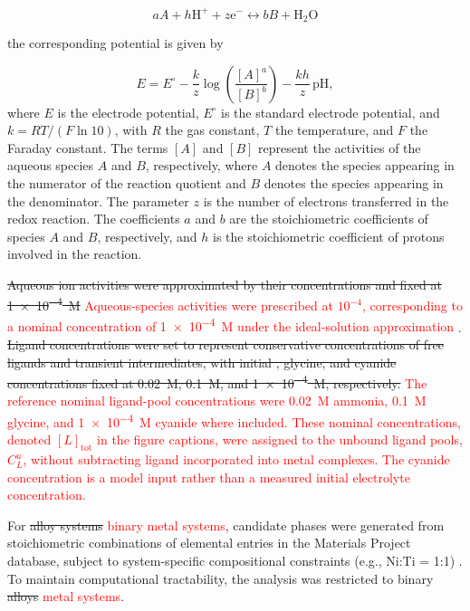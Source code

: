 \documentclass[twoside,twocolumn,9pt]{article}
\begin{document}
\begin{equation} \label{eq:reaction}
aA + h\text{H}^+ + z\text{e}^- \leftrightarrow bB + \text{H}_2\text{O}
\end{equation}

the corresponding potential is given by

\begin{equation} \label{eq:nernst}
E = E^\circ - \frac{k}{z} \log \left(\frac{[A]^a}{[B]^b}\right) - \frac{k h}{z} \, \mathrm{pH},
\end{equation}
where \(E\) is the electrode potential, \(E^\circ\) is the standard electrode potential, and \(k = RT/(F \ln 10)\), with \(R\) the gas constant, \(T\) the temperature, and \(F\) the Faraday constant. The terms \([A]\) and \([B]\) represent the activities of the aqueous species \(A\) and \(B\), respectively, where \(A\) denotes the species appearing in the numerator of the reaction quotient and \(B\) denotes the species appearing in the denominator. The parameter \(z\) is the number of electrons transferred in the redox reaction. The coefficients \(a\) and \(b\) are the stoichiometric coefficients of species \(A\) and \(B\), respectively, and \(h\) is the stoichiometric coefficient of protons involved in the reaction.

\sout{Aqueous ion activities were approximated by their concentrations and fixed at \SI{1e-4}{M}} \textcolor{red}{Aqueous-species activities were prescribed at $10^{-4}$, corresponding to a nominal concentration of \SI{1e-4}{M} under the ideal-solution approximation} \cite{Huang2017ImprovedCompounds, Wang2020PredictingFunctional}. \sout{Ligand concentrations were set to represent conservative concentrations of free ligands and transient intermediates, with initial , glycine, and cyanide concentrations fixed at \SI{0.02}{M}, \SI{0.1}{M}, and \SI{1e-4}{M}, respectively.} \textcolor{red}{The reference nominal ligand-pool concentrations were \SI{0.02}{M} ammonia, \SI{0.1}{M} glycine, and \SI{1e-4}{M} cyanide where included. These nominal concentrations, denoted $[L]_{\mathrm{tot}}$ in the figure captions, were assigned to the unbound ligand pools, $C_L^u$, without subtracting ligand incorporated into metal complexes. The cyanide concentration is a model input rather than a measured initial electrolyte concentration.}

For \sout{alloy systems} \textcolor{red}{binary metal systems}, candidate phases were generated from stoichiometric combinations of elemental entries in the Materials Project database, subject to system-specific compositional constraints (e.g., Ni:Ti = 1:1) \cite{Thompson2011PourbaixSystems}. To maintain computational tractability, the analysis was restricted to binary \sout{alloys} \textcolor{red}{metal systems}.
\end{document}
